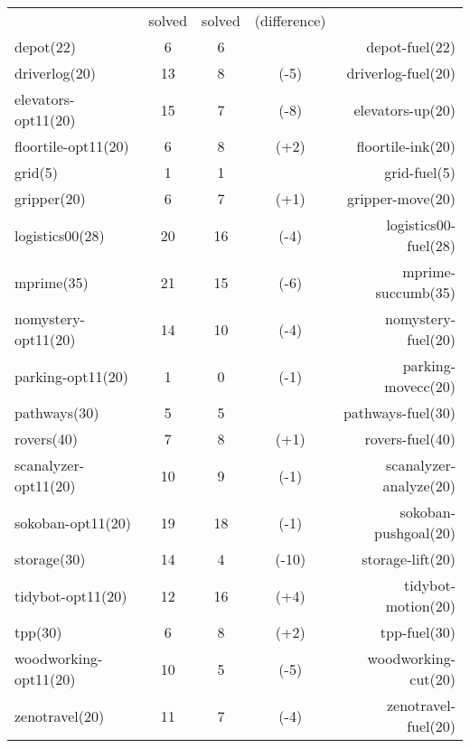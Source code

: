 \setlength{\tabcolsep}{0.2em}
\begin{center}
\begin{tabular}{|lc|ccr|}
 & solved & solved & (difference) & \\
depot(22) & 6 & 6 &  & depot-fuel(22)\\
driverlog(20) & 13 & 8 & (-5) & driverlog-fuel(20)\\
elevators-opt11(20) & 15 & 7 & (-8) & elevators-up(20)\\
floortile-opt11(20) & 6 & 8 & (+2) & floortile-ink(20)\\
grid(5) & 1 & 1 &  & grid-fuel(5)\\
gripper(20) & 6 & 7 & (+1) & gripper-move(20)\\
logistics00(28) & 20 & 16 & (-4) & logistics00-fuel(28)\\
mprime(35) & 21 & 15 & (-6) & mprime-succumb(35)\\
nomystery-opt11(20) & 14 & 10 & (-4) & nomystery-fuel(20)\\
parking-opt11(20) & 1 & 0 & (-1) & parking-movecc(20)\\
pathways(30) & 5 & 5 &  & pathways-fuel(30)\\
rovers(40) & 7 & 8 & (+1) & rovers-fuel(40)\\
scanalyzer-opt11(20) & 10 & 9 & (-1) & scanalyzer-analyze(20)\\
sokoban-opt11(20) & 19 & 18 & (-1) & sokoban-pushgoal(20)\\
storage(30) & 14 & 4 & (-10) & storage-lift(20)\\
tidybot-opt11(20) & 12 & 16 & (+4) & tidybot-motion(20)\\
tpp(30) & 6 & 8 & (+2) & tpp-fuel(30)\\
woodworking-opt11(20) & 10 & 5 & (-5) & woodworking-cut(20)\\
zenotravel(20) & 11 & 7 & (-4) & zenotravel-fuel(20)\\
\end{tabular}
\end{center}
